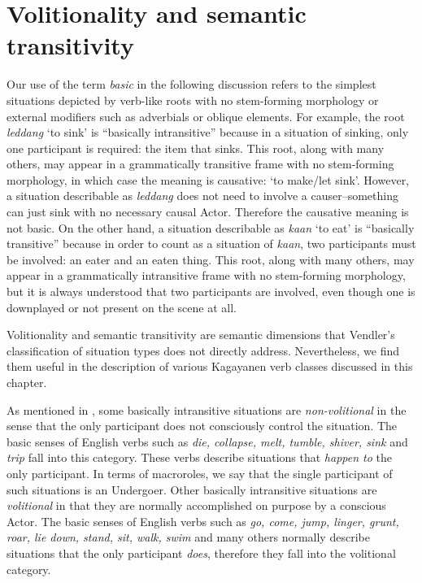 \section{Volitionality and semantic transitivity}
\label{bkm:Ref148441557}
Our use of the term \textit{basic} in the following discussion refers to the simplest situations depicted by verb-like roots with no stem-forming morphology or external modifiers such as adverbials or oblique elements. For example, the root \textit{leddang} ‘to sink’ is “basically intransitive” because in a situation of sinking, only one participant is required: the item that sinks. This root, along with many others, may appear in a grammatically transitive frame with no stem-forming morphology, in which case the meaning is causative: ‘to make/let sink’. However, a situation describable as \textit{leddang} does not need to involve a causer--something can just sink with no necessary causal Actor. Therefore the causative meaning is not basic. On the other hand, a situation describable as \textit{kaan} ‘to eat’ is “basically transitive” because in order to count as a situation of \textit{kaan}, two participants must be involved: an eater and an eaten thing. This root, along with many others, may appear in a grammatically intransitive frame with no stem-forming morphology, but it is always understood that two participants are involved, even though one is downplayed or not present on the scene at all.

Volitionality and semantic transitivity are semantic dimensions that Vendler’s classification of situation types does not directly address. Nevertheless, we find them useful in the description of various Kagayanen verb classes discussed in this chapter.

As mentioned in , some basically intransitive situations are \textit{non-volitional} in the sense that the only participant does not consciously control the situation. The basic senses of English verbs such as \textit{die, collapse, melt, tumble, shiver, sink} and \textit{trip} fall into this category. These verbs describe situations that \textit{happen to} the only participant. In terms of macroroles, we say that the single participant of such situations is an Undergoer. Other basically intransitive situations are \textit{volitional} in that they are normally accomplished on purpose by a conscious Actor. The basic senses of English verbs such as \textit{go, come, jump, linger, grunt, roar, lie down, stand, sit, walk, swim} and many others normally describe situations that the only participant \textit{does}, therefore they fall into the volitional category.

